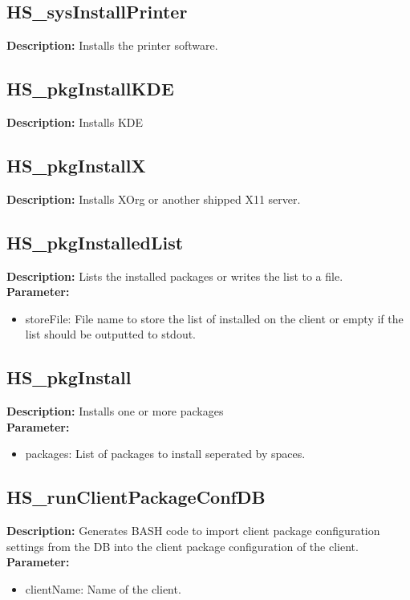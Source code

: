 \subsection{HS\_sysInstallPrinter}
\textbf{Description:} Installs the printer software.\\

\subsection{HS\_pkgInstallKDE}
\textbf{Description:} Installs KDE\\

\subsection{HS\_pkgInstallX}
\textbf{Description:} Installs XOrg or another shipped X11 server.\\

\subsection{HS\_pkgInstalledList}
\textbf{Description:} Lists the installed packages or writes the list to a file.\\
\textbf{Parameter:}
\begin{itemize}
\item storeFile: File name to store the list of installed on the client or empty if the list should be outputted to stdout.
\end{itemize}

\subsection{HS\_pkgInstall}
\textbf{Description:} Installs one or more packages\\
\textbf{Parameter:}
\begin{itemize}
\item packages: List of packages to install seperated by spaces.
\end{itemize}

\subsection{HS\_runClientPackageConfDB}
\textbf{Description:} Generates BASH code to import client package configuration settings from the DB into the client package configuration of the client.\\
\textbf{Parameter:}
\begin{itemize}
\item clientName: Name of the client.
\end{itemize}

